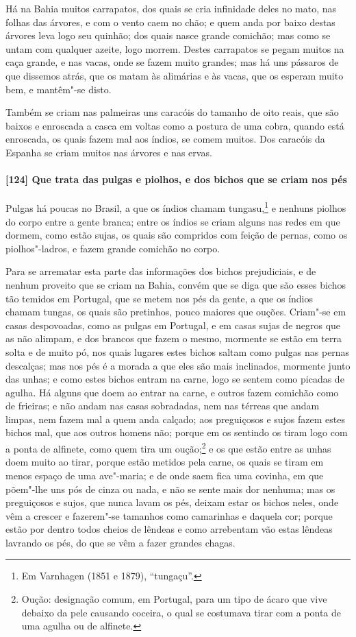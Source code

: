 \begin{linenumbers}
Há na Bahia muitos carrapatos, dos quais se cria infinidade deles no mato, nas folhas das
árvores, e com o vento caem no chão; e quem anda por baixo destas árvores leva logo seu
quinhão; dos quais nasce grande comichão; mas como se untam com qualquer azeite, logo
morrem. Destes carrapatos se pegam muitos na caça grande, e nas vacas, onde se fazem muito
grandes; mas há uns pássaros de que dissemos atrás, que os matam às alimárias e às vacas,
que os esperam muito bem, e mantêm"-se disto.

Também se criam nas palmeiras uns caracóis do tamanho de oito reais, que são baixos e
enroscada a casca em voltas como a postura de uma cobra, quando está enroscada, os quais
fazem mal aos índios, se comem muitos. Dos caracóis da Espanha se criam muitos nas árvores
e nas ervas.

\paragraph{[124] Que trata das pulgas e piolhos, e dos bichos que se criam nos pés}\quad
Pulgas há poucas no Brasil, a que os índios chamam tungasu,\footnote{ Em Varnhagen (1851 e
1879), ``tungaçu''.} e nenhuns piolhos do corpo entre a gente branca; entre os índios se
criam alguns nas redes em que dormem, como estão sujas, os quais são compridos com feição
de pernas, como os piolhos"-ladros, e fazem grande comichão no corpo.

Para se arrematar esta parte das informações dos bichos prejudiciais, e de nenhum proveito
que se criam na Bahia, convém que se diga que são esses bichos tão temidos em Portugal,
que se metem nos pés da gente, a que os índios chamam tungas, os quais são pretinhos,
pouco maiores que ouções. Criam"-se em casas despovoadas, como as pulgas em Portugal, e em
casas sujas de negros que as não alimpam, e dos brancos que fazem o mesmo, mormente se
estão em terra solta e de muito pó, nos quais lugares estes bichos saltam como pulgas nas
pernas descalças; mas nos pés é a morada a que eles são mais inclinados, mormente junto
das unhas; e como estes bichos entram na carne, logo se sentem como picadas de agulha. Há
alguns que doem ao entrar na carne, e outros fazem comichão como de frieiras; e não andam
nas casas sobradadas, nem nas térreas que andam limpas, nem fazem mal a quem anda calçado;
aos preguiçosos e sujos fazem estes bichos mal, que aos outros homens não; porque em os
sentindo os tiram logo com a ponta de alfinete, como quem tira um oução;\footnote{ Oução:
designação comum, em Portugal, para um tipo de ácaro que vive debaixo da pele causando
coceira, o qual se costumava tirar com a ponta de uma agulha ou de alfinete.} e os que
estão entre as unhas doem muito ao tirar, porque estão metidos pela carne, os quais se
tiram em menos espaço de uma ave"-maria; e de onde saem fica uma covinha, em que põem"-lhe
uns pós de cinza ou nada, e não se sente mais dor nenhuma; mas os preguiçosos e sujos, que
nunca lavam os pés, deixam estar os bichos neles, onde vêm a crescer e fazerem"-se tamanhos
como camarinhas e daquela cor; porque estão por dentro todos cheios de lêndeas e como
arrebentam vão estas lêndeas lavrando os pés, do que se vêm a fazer grandes chagas.


\end{linenumbers}
